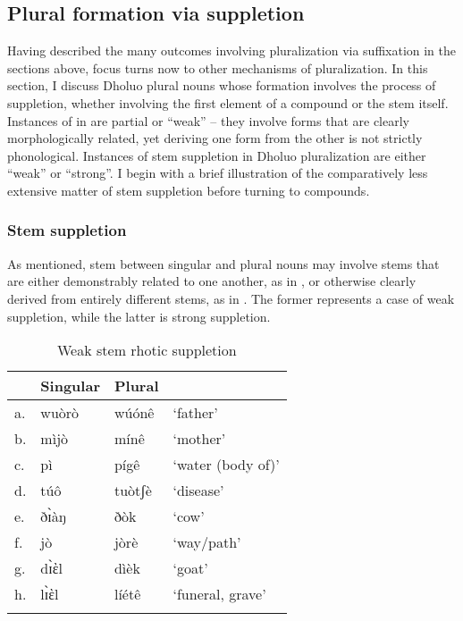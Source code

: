 \documentclass[output=paper,colorlinks,citecolor=brown]{langscibook}
\begin{document}
\subsection{Plural formation via suppletion}

Having described the many outcomes involving pluralization via suffixation in the sections above, focus turns now to other mechanisms of pluralization. In this section, I discuss Dholuo plural nouns whose formation involves the process of suppletion, whether involving the first element of a compound or the stem itself. Instances of  in  are partial or ``weak'' -- they involve forms that are clearly morphologically related, yet deriving one form from the other is not strictly phonological. Instances of stem suppletion in Dholuo pluralization are either ``weak'' or ``strong''. I begin with a brief illustration of the comparatively less extensive matter of stem suppletion before turning to compounds.

\subsubsection{Stem suppletion}

As mentioned, stem  between singular and plural nouns may involve stems that are either demonstrably related to one another, as in , or otherwise clearly derived from entirely different stems, as in . The former represents a case of weak suppletion, while the latter is strong suppletion.

\begin{table}
\caption{Weak stem rhotic suppletion}
\label{tab:WeakStem}
 \begin{tabular}{llll}
  \lsptoprule
& Singular & Plural &  \\
\midrule
a.	&wuòrò&	wúónê	&`father'\\
b.&	mìjò	&mínê	&`mother'\\
c.	&pì&	pígê	&`water (body of)'\\
d.	&túô	&tuòtʃè	&`disease'\\
e.&	ðɪ̀àŋ	&ðòk	&`cow'\\
f.&	jò	&jòrè&	`way/path'\\
g.&	dɪ̀ὲl&	dìèk	&`goat'\\
h.&	lɪ̀ὲl	&líétê	&`funeral, grave'\\
  \lspbottomrule
 \end{tabular}
\end{table}   
\end{document}
